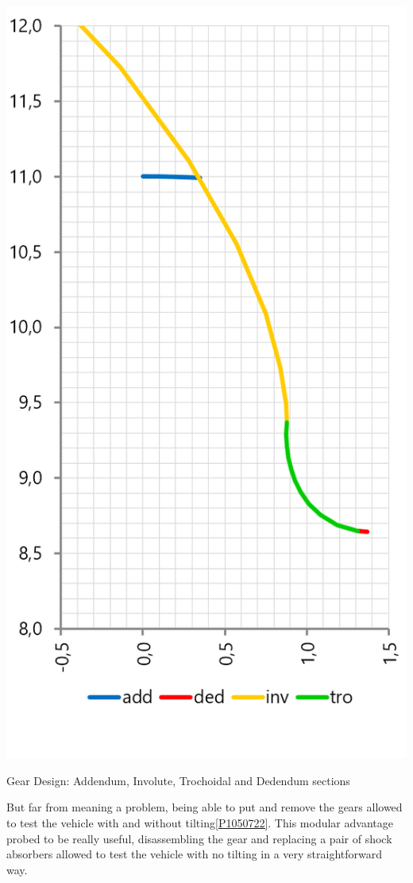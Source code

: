 \begin{marginfigure}[-2.75cm]
	\includegraphics[width=1\linewidth]{figs/05/involute}
	\caption{Gear Design: Addendum, Involute, Trochoidal and Dedendum sections}
\end{marginfigure}
But far from meaning a problem, being able to put and remove the gears allowed to test the vehicle with and without tilting\ref{P1050722}. This modular advantage probed to be really useful, disassembling the gear and replacing a pair of shock absorbers allowed to test the vehicle with no tilting in a very straightforward way.

